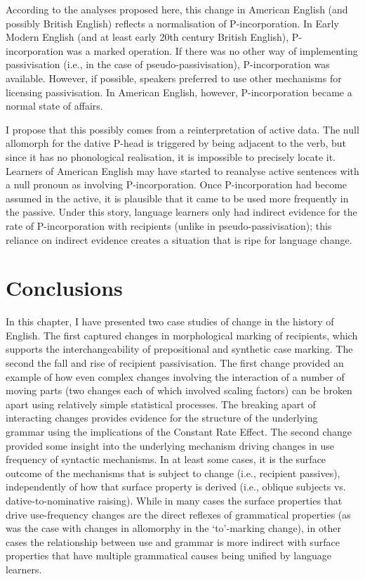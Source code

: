 	According to the analyses proposed here, this change in American English (and possibly British English) reflects a normalisation of P-incorporation. In Early Modern English (and at least early 20th century British English), P-incorporation was a marked operation. If there was no other way of implementing passivisation (i.e., in the case of pseudo-passivisation), P-incorporation was available. However, if possible, speakers preferred to use other mechanisms for licensing passivisation. In American English, however, P-incorporation became a normal state of affairs. 
	
	I propose that this possibly comes from a reinterpretation of active data. The null allomorph for the dative P-head is triggered by being adjacent to the verb, but since it has no phonological realisation, it is impossible to precisely locate it. Learners of American English may have started to reanalyse active sentences with a null pronoun as involving P-incorporation. Once P-incorporation had become assumed in the active, it is plausible that it came to be used more frequently in the passive. Under this story, language learners only had indirect evidence for the rate of P-incorporation with recipients (unlike in pseudo-passivisation); this reliance on indirect evidence creates a situation that is ripe for language change.

\section{Conclusions}
	In this chapter, I have presented two case studies of change in the history of English. The first captured changes in morphological marking of recipients, which supports the interchangeability of prepositional and synthetic case marking. The second the fall and rise of recipient passivisation. The first change provided an example of how even complex changes involving the interaction of a number of moving parts (two changes each of which involved scaling factors) can be broken apart using relatively simple statistical processes. The breaking apart of interacting changes provides evidence for the structure of the underlying grammar using the implications of the Constant Rate Effect. The second change provided some insight into the underlying mechanism driving changes in use frequency of syntactic mechanisms. In at least some cases, it is the surface outcome of the mechanisms that is subject to change (i.e., recipient passives), independently of how that surface property is derived (i.e., oblique subjects vs. dative-to-nominative raising). While in many cases the surface properties that drive use-frequency changes are the direct reflexes of grammatical properties (as was the case with changes in allomorphy in the `to'-marking change), in other cases the relationship between use and grammar is more indirect with surface properties that have multiple grammatical causes being unified by language learners.

%
